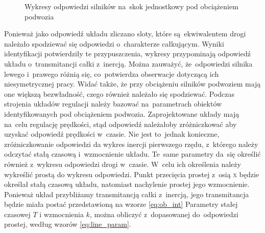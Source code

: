 \documentclass[11pt]{article}
\begin{document}
\begin{figure}[!htbp] 
	\quad 
	\caption{Wykresy odpowiedzi silników na~skok jednostkowy pod obciążeniem podwozia} 
\end{figure}

Ponieważ jako odpowiedź układu zliczano sloty, które są~ekwiwalentem drogi należało spodziewać się odpowiedzi o~charakterze całkującym.
Wyniki identyfikacji potwierdziły te przypuszczenia, wykresy przypominają odpowiedź układu o~transmitancji całki z~inercją.
Można zauważyć, że~odpowiedzi silnika lewego i~prawego różnią się, co~potwierdza obserwacje dotyczącą ich niesymetrycznej pracy.
Widać także, że przy obciążeniu silników podwoziem mają one większą bezwładność, czego również należało się spodziewać.
Podczas strojenia układów regulacji należy bazować na~parametrach obiektów identyfikowanych pod obciążeniem podwozia.
Zaprojektowane układy mają na~celu regulację prędkości, stąd odpowiedź należałoby zróżniczkować aby uzyskać odpowiedź prędkości w~czasie.
Nie jest to~jednak konieczne, zróżniczkowanie odpowiedzi da wykres inercji pierwszego rzędu, z~którego należy odczytać stałą czasową i~wzmocnienie układu.
Te~same parametry da~się określić również z~wykresu odpowiedzi drogi w~czasie.
W~celu ich określenia należy wykreślić prostą do wykresu odpowiedzi.
Punkt przecięcia prostej z~osią \textsc{x} będzie określał stałą czasową układu, natomiast nachylenie prostej jego wzmocnienie.
Ponieważ układ przybliżamy transmitancją całki z~inercją, jego transmitancja będzie miała postać przedstawioną na wzorze \ref{eq:ob_int}
Parametry stałej czasowej $ T $ i wzmocnienia $ k $, można obliczyć z~dopasowanej do~odpowiedzi prostej, według wzorów \ref{eq:line_param}.
\end{document}
